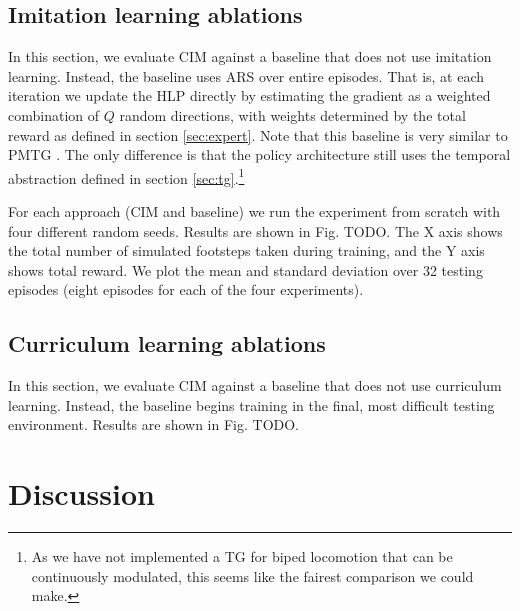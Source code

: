 \documentclass[a4paper]{article}
\begin{document}

\subsection{Imitation learning ablations}

In this section, we evaluate CIM against a baseline that does not use imitation learning.
Instead, the baseline uses ARS \citep{mania2018simple} over entire episodes.
That is, at each iteration we update the HLP directly by estimating the gradient as a weighted combination of $Q$ random directions,
with weights determined by the total reward as defined in section \ref{sec:expert}.
Note that this baseline is very similar to PMTG \citep{iscen2018pmtg}.
The only difference is that the policy architecture still uses the temporal abstraction defined in section \ref{sec:tg}.\footnote{
As we have not implemented a TG for biped locomotion that can be continuously modulated, this seems like the fairest comparison we could make.}

For each approach (CIM and baseline) we run the experiment from scratch with four different random seeds.
Results are shown in Fig. TODO. The X axis shows the total number of simulated footsteps taken during training, and the Y axis shows total reward. We plot the mean and standard deviation over 32 testing episodes (eight episodes for each of the four experiments).

\subsection{Curriculum learning ablations}

In this section, we evaluate CIM against a baseline that does not use curriculum learning.
Instead, the baseline begins training in the final, most difficult testing environment.
Results are shown in Fig. TODO.

\section{Discussion}
\end{document}

